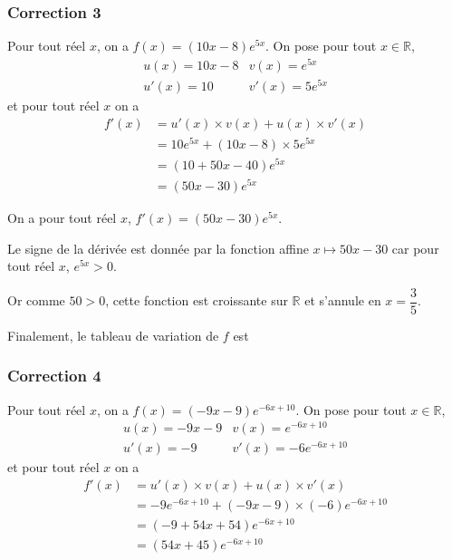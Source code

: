 \documentclass[15pt, mathserif]{beamer}
\begin{document}
\begin{frame}
\vspace{-10mm}
	\frametitle{Correction 3}
Pour tout réel $x$, on a $f(x) =(10x-8)e^{5x}$. On pose pour tout $x \in \mathbb{R}$,\[\begin{matrix}u(x) = 10x-8& v(x) = e^{5x}\\ u'(x) = 10& v'(x) = 5e^{5x}\end{matrix}\]et pour tout réel $x$ on a \begin{align*}f'(x)&= u'(x) \times v(x) + u(x) \times v'(x) \\ &=10e^{5x}+(10x-8)\times 5 e^{5x} \\
	 &= (10+50x-40)e^{5x} \\
	 &= (50x-30)e^{5x}
\end{align*}

\end{frame}

\begin{frame}On a pour tout réel $x$, $f'(x) = (50x-30)e^{5x}$.

Le signe de la dérivée est donnée par la fonction affine $x \mapsto 50x-30$ car pour tout réel $x$, $e^{5x}>0$.

Or comme $50>0$, cette fonction est croissante sur $\mathbb{R}$ et s'annule en $x = \dfrac{3}{5}$.

Finalement, le tableau de variation de $f$ est

\hfil{}\end{frame}


\begin{frame}
\vspace{-10mm}
	\frametitle{Correction 4}
Pour tout réel $x$, on a $f(x) =(-9x-9)e^{-6x+10}$. On pose pour tout $x \in \mathbb{R}$,\[\begin{matrix}u(x) = -9x-9& v(x) = e^{-6x+10}\\ u'(x) = -9& v'(x) = -6e^{-6x+10}\end{matrix}\]et pour tout réel $x$ on a \begin{align*}f'(x)&= u'(x) \times v(x) + u(x) \times v'(x) \\ &=-9e^{-6x+10}+(-9x-9)\times \left(-6\right) e^{-6x+10} \\
	 &= (-9+54x+54)e^{-6x+10} \\
	 &= (54x+45)e^{-6x+10}
\end{align*}

\end{frame}
\end{document}
